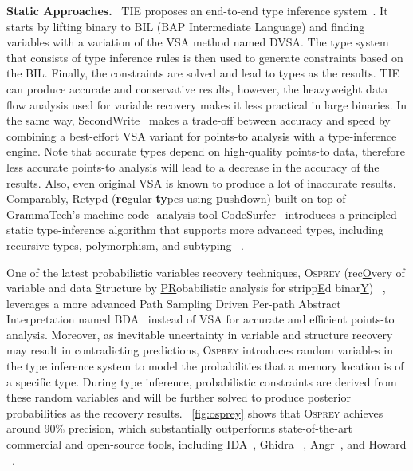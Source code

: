 \noindent\textbf{Static Approaches.}~
TIE proposes an end-to-end type inference system~\cite{lee2011tie}. It starts 
by lifting binary to BIL (BAP Intermediate Language) and finding variables with 
a variation of the VSA method named DVSA. The type system that consists of type 
inference rules is then used to generate constraints based on the BIL. Finally, 
the constraints are solved and lead to types as the results. TIE can produce 
accurate and conservative results, however, the heavyweight data flow analysis 
used for variable recovery makes it less practical in large binaries.
In the same way, SecondWrite~\cite{elwazeer2013scalable} makes a trade-off 
between accuracy and speed by combining a best-effort VSA variant for points-to 
analysis with a type-inference engine. Note that accurate types depend on 
high-quality points-to data, therefore less accurate points-to analysis will 
lead to a decrease in the accuracy of the results. Also, even original VSA is 
known to produce a lot of inaccurate results.
Comparably, Retypd (\textbf{re}gular \textbf{ty}pes using 
\textbf{p}ush\textbf{d}own) built on top of GrammaTech’s machine-code-
analysis tool CodeSurfer~\cite{balakrishnan2005codesurfer} introduces a 
principled static type-inference algorithm that supports more advanced types, 
including recursive types, polymorphism, and subtyping
~\cite{noonan2016polymorphic}.

One of the latest probabilistic variables recovery techniques, \textsc{Osprey} 
(rec\underline{O}very of variable and data \underline{S}tructure by 
\underline{PR}obabilistic analysis for stripp\underline{E}d binar\underline{Y})
~\cite{zhang2021osprey}, leverages a more advanced Path Sampling Driven 
Per-path Abstract Interpretation named BDA~\cite{zhang2019bda} instead of VSA 
for accurate and efficient points-to analysis. Moreover, as inevitable 
uncertainty in variable and structure recovery may result in contradicting 
predictions, \textsc{Osprey} introduces random variables in the type inference 
system to model the probabilities that a memory location is of a specific type. 
During type inference, probabilistic constraints are derived from these random 
variables and will be further solved to produce posterior probabilities as the 
recovery results. \F~\ref{fig:osprey} shows that \textsc{Osprey} achieves 
around 90\% precision, which substantially outperforms state-of-the-art 
commercial and open-source tools, including IDA~\cite{hex2014ida}, Ghidra
~\cite{ghidra}, Angr~\cite{shoshitaishvili2016sok}, and Howard
~\cite{slowinska2011howard}.

